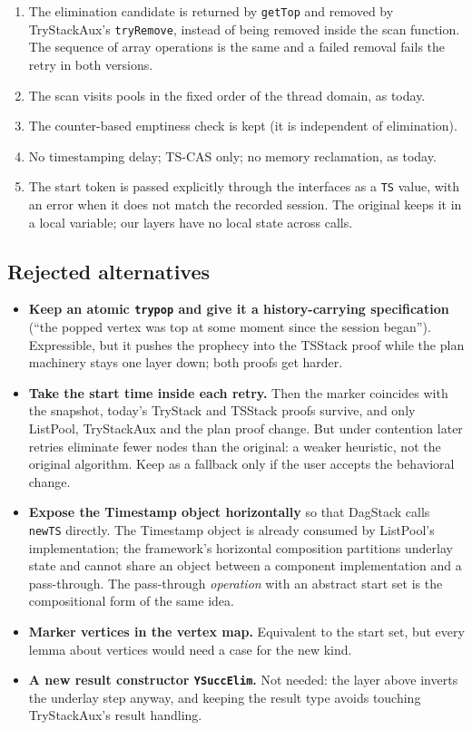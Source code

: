 \documentclass[11pt]{article}
\theoremstyle{definition}
\theoremstyle{remark}
\newcommand{\code}[1]{\texttt{#1}}
\newcommand{\sol}[1]{\textbf{#1}}
\begin{document}
\begin{enumerate}[nosep]
\item The elimination candidate is returned by \code{getTop} and removed
  by TryStackAux's \code{tryRemove}, instead of being removed inside the
  scan function. The sequence of array operations is the same and a
  failed removal fails the retry in both versions.
\item The scan visits pools in the fixed order of the thread domain, as
  today.
\item The counter-based emptiness check is kept (it is independent of
  elimination).
\item No timestamping delay; TS-CAS only; no memory reclamation, as
  today.
\item The start token is passed explicitly through the interfaces as a
  \code{TS} value, with an error when it does not match the recorded
  session. The original keeps it in a local variable; our layers have no
  local state across calls.
\end{enumerate}

\subsection{Rejected alternatives}

\begin{itemize}
\item \sol{Keep an atomic \code{trypop} and give it a history-carrying
  specification} (``the popped vertex was top at some moment since the
  session began''). Expressible, but it pushes the prophecy into the
  TSStack proof while the plan machinery stays one layer down; both
  proofs get harder.
\item \sol{Take the start time inside each retry.} Then the marker
  coincides with the snapshot, today's TryStack and TSStack proofs survive,
  and only ListPool, TryStackAux and the plan proof change. But under
  contention later retries eliminate fewer nodes than the original: a
  weaker heuristic, not the original algorithm. Keep as a fallback only if
  the user accepts the behavioral change.
\item \sol{Expose the Timestamp object horizontally} so that DagStack
  calls \code{newTS} directly. The Timestamp object is already consumed by
  ListPool's implementation; the framework's horizontal composition
  partitions underlay state and cannot share an object between a
  component implementation and a pass-through. The pass-through
  \emph{operation} with an abstract start set is the compositional form
  of the same idea.
\item \sol{Marker vertices in the vertex map.} Equivalent to the start
  set, but every lemma about vertices would need a case for the new kind.
\item \sol{A new result constructor \code{YSuccElim}.} Not needed: the
  layer above inverts the underlay step anyway, and keeping the result
  type avoids touching TryStackAux's result handling.
\end{itemize}
\end{document}
